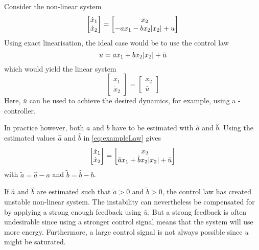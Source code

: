 \begin{example}\label{ex:exact}
Consider the non-linear system
\begin{equation}\label{eq:exampleSys}
\begin{bmatrix}
\dot{x}_1\\
\dot{x}_2
\end{bmatrix}=
\begin{bmatrix}
x_2\\
-a x_1 - b x_2|x_2| + u
\end{bmatrix}
\end{equation}
Using exact linearisation, the ideal case would be to use the control law 
\begin{equation}\label{eq:exampleLaw}
u = a x_1 +b x_2|x_2| + \bar{u}
\end{equation} which would yield the linear system
\begin{equation}
\begin{bmatrix}
\dot{x}_1\\
\dot{x}_2
\end{bmatrix}=
\begin{bmatrix}
x_2\\
\bar{u}
\end{bmatrix}
\end{equation}
Here, $\bar{u}$ can be used to achieve the desired dynamics, for example, using a \abbrPID-controller. 

In practice however, both $a$ and $b$ have to be estimated with $\hat{a}$ and $\hat{b}$. Using the estimated values $\hat{a}$ and $\hat{b}$ in \eqref{eq:exampleLaw} gives 
\begin{equation}
\begin{bmatrix}
\dot{x}_1\\
\dot{x}_2
\end{bmatrix}=
\begin{bmatrix}
x_2\\
\tilde{a} x_1 + \tilde{b} x_2|x_2| +\bar{u}
\end{bmatrix}
\end{equation}
with $\tilde{a}=\hat{a}-a$ and $\tilde{b}=\hat{b}-b$.

If $\hat{a}$ and $\hat{b}$ are estimated such that $\tilde{a} > 0$ and $\tilde{b} > 0$,
the control law has created unstable non-linear system. The instability can nevertheless be compensated for by 
applying a strong enough feedback using $\bar{u}$. But a strong feedback is often undesirable since using a stronger control signal means that the system will use more energy. Furthermore, a large control signal is not always possible since $u$ might be saturated.  
\end{example}


